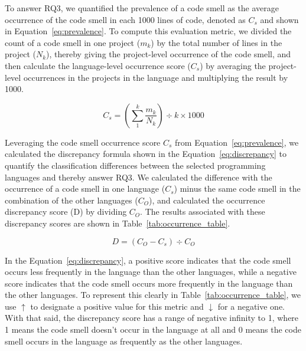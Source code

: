 To answer RQ3, we quantified the prevalence of a code smell as the average
occurrence of the code smell in each 1000 lines of code, denoted as $C_{s}$ and
shown in Equation~\ref{eq:prevalence}. To compute this evaluation metric, we
divided the count of a code smell in one project ($m_{k}$) by the total number
of lines in the project ($N_{k}$), thereby giving the project-level occurrence
of the code smell, and then calculate the language-level occurrence score
($C_{s}$) by averaging the project-level occurrences in the projects in the
language and multiplying the result by 1000.


\begin{equation}
C_{s} = \left( \sum_{1}^{k}{\frac{m_{k}}{N_{k}}} \right) \div k \times 1000
\label{eq:prevalence}
\end{equation}


Leveraging the code smell occurrence score $C_{s}$ from
Equation~\ref{eq:prevalence}, we calculated the discrepancy formula shown in the
Equation~\ref{eq:discrepancy} to quantify the classification differences between
the selected programming languages and thereby answer RQ3.
%
We calculated the difference with the occurrence of a code smell in one language
($C_{s}$) minus the same code smell in the combination of the other languages
($C_{O}$), and calculated the occurrence discrepancy score (D) by dividing
$C_{O}$. The results associated with these discrepancy scores are shown in
Table~\ref{tab:occurrence_table}.


\begin{equation}
    D = (C_{O} - C_{s}) \div C_{O}
    \label{eq:discrepancy}
\end{equation}

In the Equation~\ref{eq:discrepancy}, a positive score indicates that the code
smell occurs less frequently in the language than the other languages, while a
negative score indicates that the code smell occurs more frequently in the
language than the other languages.
%
To represent this clearly in Table~\ref{tab:occurrence_table}, we use $\uparrow$
to designate a positive value for this metric and $\downarrow$ for a negative
one.
%
With that said, the discrepancy score has a range of negative infinity to 1,
where 1 means the code smell doesn't occur in the language at all and 0 means
the code smell occurs in the language as frequently as the other languages.

